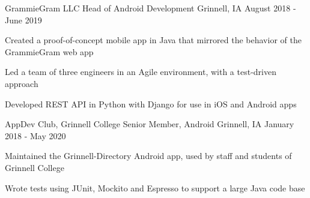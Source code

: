 \documentclass[12pt, a4paper]{awesome-cv}
\begin{document}
\begin{cventries}
  \cventry
    {GrammieGram LLC}
    {Head of Android Development}
    {Grinnell, IA}
    {August 2018 - June 2019}
    {
      \begin{cvitems}
	    \item {Created a proof-of-concept mobile app in Java that mirrored the behavior of the GrammieGram web app}
        \item {Led a team of three engineers in an Agile environment, with a test-driven approach}
      	\item {Developed REST API in Python with Django for use in iOS and Android apps}
      \end{cvitems}
    }


  \cventry
    {AppDev Club, Grinnell College}
    {Senior Member, Android}
    {Grinnell, IA}
    {January 2018 - May 2020}
    {
      \begin{cvitems}
        \item {Maintained the Grinnell-Directory Android app, used by staff and students of Grinnell College}	
        \item {Wrote tests using JUnit, Mockito and Espresso to support a large Java code base}
      \end{cvitems}
    }




\end{cventries}
\end{document}

